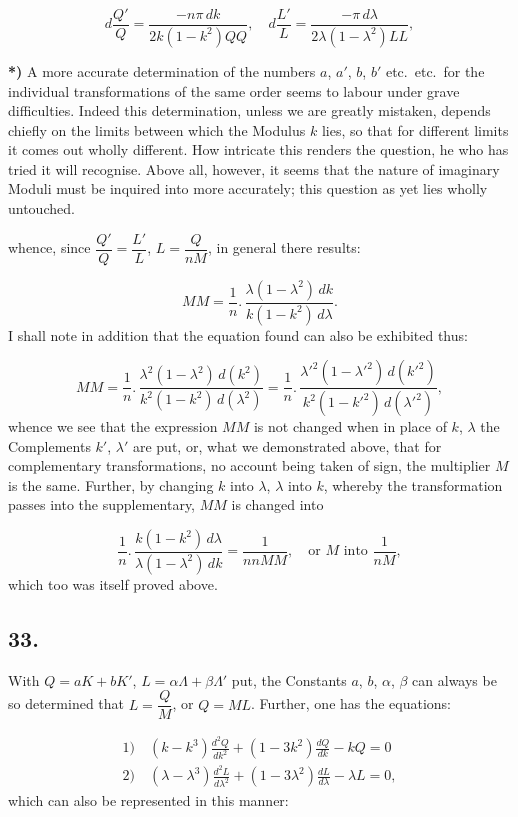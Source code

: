 \documentclass{article}
\begin{document}
\[
d\frac{Q'}{Q}=\frac{-n\pi\,dk}{2k(1-k^{2})QQ},\quad d\frac{L'}{L}=\frac{-\pi\,d\lambda}{2\lambda(1-\lambda^{2})LL},
\]

\textbf{*)} A more accurate determination of the numbers $a$, $a'$, $b$, $b'$ etc.\ etc.\ for the individual transformations of the same order seems to labour under grave difficulties. Indeed this determination, unless we are greatly mistaken, depends chiefly on the limits between which the Modulus $k$ lies, so that for different limits it comes out wholly different. How intricate this renders the question, he who has tried it will recognise. Above all, however, it seems that the nature of imaginary Moduli must be inquired into more accurately; this question as yet lies wholly untouched.

whence, since $\dfrac{Q'}{Q}=\dfrac{L'}{L}$, $L=\dfrac{Q}{nM}$, in general there results:

\[
MM=\frac{1}{n}.\,\frac{\lambda(1-\lambda^{2})\,dk}{k(1-k^{2})\,d\lambda}.
\]
I shall note in addition that the equation found can also be exhibited thus:

\[
MM=\frac{1}{n}.\,\frac{\lambda^{2}(1-\lambda^{2})\,d(k^{2})}{k^{2}(1-k^{2})\,d(\lambda^{2})}=\frac{1}{n}.\,\frac{\lambda'^{2}(1-\lambda'^{2})\,d(k'^{2})}{k^{2}(1-k'^{2})\,d(\lambda'^{2})},
\]
whence we see that the expression $MM$ is not changed when in place of $k$, $\lambda$ the Complements $k'$, $\lambda'$ are put, or, what we demonstrated above, that for complementary transformations, no account being taken of sign, the multiplier $M$ is the same. Further, by changing $k$ into $\lambda$, $\lambda$ into $k$, whereby the transformation passes into the supplementary, $MM$ is changed into

\[
\frac{1}{n}.\,\frac{k(1-k^{2})\,d\lambda}{\lambda(1-\lambda^{2})\,dk}=\frac{1}{nnMM},\quad\text{or }M\text{ into }\frac{1}{nM},
\]
which too was itself proved above.

\subsection*{33.}

With $Q=aK+bK'$, $L=\alpha\Lambda+\beta\Lambda'$ put, the Constants $a$, $b$, $\alpha$, $\beta$ can always be so determined that $L=\dfrac{Q}{M}$, or $Q=ML$. Further, one has the equations:

\[
\begin{gathered}
\text{1)}\quad(k-k^{3})\frac{d^{2}Q}{dk^{2}}+(1-3k^{2})\frac{dQ}{dk}-kQ=0\\[1.5ex]
\text{2)}\quad(\lambda-\lambda^{3})\frac{d^{2}L}{d\lambda^{2}}+(1-3\lambda^{2})\frac{dL}{d\lambda}-\lambda L=0,
\end{gathered}
\]
which can also be represented in this manner:
\end{document}

